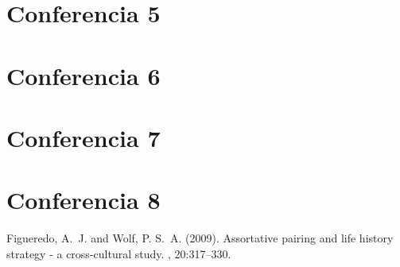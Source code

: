 \documentclass[]{article}
\begin{document}

\section*{Conferencia 5}


\section*{Conferencia 6}


\section*{Conferencia 7}


\section*{Conferencia 8}



\begin{thebibliography}{99} %

Figueredo, A.~J. and Wolf, P. S.~A. (2009).
\newblock Assortative pairing and life history strategy - a cross-cultural
  study.
, 20:317--330.
 
\end{thebibliography}

\end{document}
